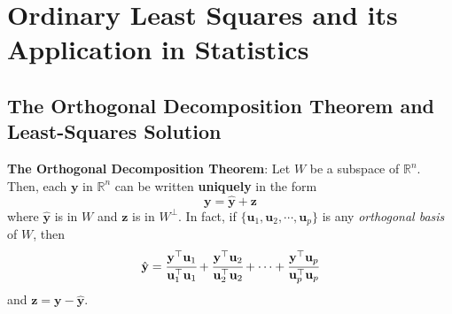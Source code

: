 \section{Ordinary Least Squares and its Application in Statistics}
\subsection{The Orthogonal Decomposition Theorem  and Least-Squares Solution}

\begin{Thm}\label{7-1}
\textbf{The Orthogonal Decomposition Theorem}:
Let $W$ be a subspace of $\mathbb{R}^n$. Then, each $\mathbf{y}$ in $\mathbb{R}^n$ can be written \textbf{uniquely} in the form
\begin{equation}
    \mathbf{y} = \hat{\mathbf{y}} + \mathbf{z}
\end{equation}
where $\hat{\mathbf{y}}$ is in $W$ and $\mathbf{z}$ is in $W^{\bot}$. In fact, if $\{\mathbf{u}_1, \mathbf{u}_2, \cdots, \mathbf{u}_p \}$ is any \textit{orthogonal basis} of $W$, then
\begin{equation}
    \hat{\mathbf{y}} = \cfrac{\mathbf{y}^{\top}\mathbf{u}_1}{\mathbf{u}_1^{\top} \mathbf{u}_1} + \cfrac{\mathbf{y}^{\top}\mathbf{u}_2}{\mathbf{u}_2^{\top} \mathbf{u}_2} + \cdots + \cfrac{\mathbf{y}^{\top}\mathbf{u}_p}{\mathbf{u}_p^{\top} \mathbf{u}_p}
\end{equation}
and $\mathbf{z} = \mathbf{y} - \hat{\mathbf{y}}$.
\end{Thm}

